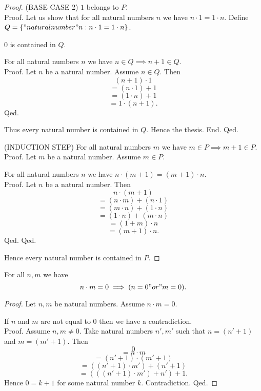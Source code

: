 \documentclass[../../natural-numbers.ftl.tex]{subfiles}
\begin{document}
\begin{forthel}
\begin{proof}
      (BASE CASE 2) $1$ belongs to $P$. \\
      Proof.
        Let us show that for all natural numbers $n$ we have $n \cdot 1 = 1 \cdot n$.
          Define $Q = \{ "natural number" n : n \cdot 1 = 1 \cdot n \}$.

          $0$ is contained in $Q$.

          For all natural numbers $n$ we have $n \in Q \implies n + 1 \in Q$. \\
          Proof.
            Let $n$ be a natural number.
            Assume $n \in Q$.
            Then
            $$  (n + 1) \cdot 1$$
            $$= (n \cdot 1) + 1$$   %
            $$= (1 \cdot n) + 1$$   %
            $$= 1 \cdot (n + 1).$$  %
          Qed.

          Thus every natural number is contained in $Q$.
          Hence the thesis.
        End.
      Qed.

      (INDUCTION STEP) For all natural numbers $m$ we have $m \in P \implies m + 1 \in P$. \\
      Proof.
        Let $m$ be a natural number.
        Assume $m \in P$.

        For all natural numbers $n$ we have $n \cdot (m + 1) = (m + 1) \cdot n$. \\
        Proof.
          Let $n$ be a natural number.
          Then
          $$n \cdot (m + 1)$$
          $$= (n \cdot m) + (n \cdot 1)$$
          $$= (m \cdot n) + (1 \cdot n)$$
          $$= (1 \cdot n) + (m \cdot n)$$
          $$= (1 + m) \cdot n$$
          $$= (m + 1) \cdot n.$$
        Qed.
      Qed.

      Hence every natural number is contained in $P$.
    \end{proof}


    \begin{proposition}[NN 01 03 692941]
      For all $n,m$ we have
      $$n \cdot m = 0 \implies (n = 0 "or" m = 0).$$
    \end{proposition}
    \begin{proof}
      Let $n,m$ be natural numbers.
      Assume $n \cdot m = 0$.

      If $n$ and $m$ are not equal to $0$ then we have a contradiction. \\
      Proof.
        Assume $n,m \neq 0$.
        Take natural numbers $n',m'$ such that $n = (n' + 1)$ and $m = (m' + 1)$.
        Then
        $$0$$
        $$= n \cdot m$$
        $$= (n' + 1) \cdot (m' + 1)$$
        $$= ((n' + 1) \cdot m') + (n' + 1)$$
        $$= (((n' + 1) \cdot m') + n') + 1.$$
        Hence $0 = k + 1$ for some natural number $k$.
        Contradiction.
      Qed.


\end{proof}
\end{forthel}
\end{document}
